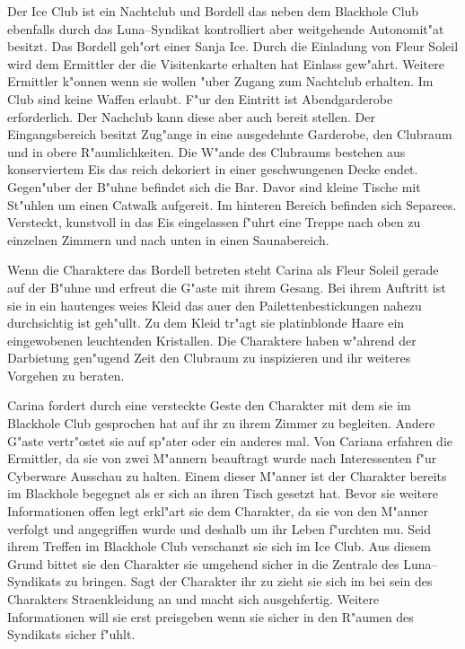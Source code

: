 Der Ice Club ist ein Nachtclub und Bordell das neben dem Blackhole Club ebenfalls durch das Luna--Syndikat kontrolliert aber weitgehende Autonomit"at besitzt. Das Bordell geh"ort einer Sanja Ice. Durch die Einladung von Fleur Soleil wird dem Ermittler der die Visitenkarte erhalten hat Einlass gew"ahrt. Weitere Ermittler k"onnen wenn sie wollen "uber \xl{} Zugang zum Nachtclub erhalten. Im Club sind keine Waffen erlaubt. F"ur den Eintritt ist Abendgarderobe erforderlich. Der Nachclub kann diese aber auch bereit stellen. Der Eingangsbereich besitzt Zug"ange in eine ausgedehnte Garderobe, den Clubraum und in obere R"aumlichkeiten. Die W"ande des Clubraums bestehen aus konserviertem Eis das reich dekoriert in einer geschwungenen Decke endet. Gegen"uber der B"uhne befindet sich die Bar. Davor sind kleine Tische mit St"uhlen um einen Catwalk aufgereit. Im hinteren Bereich befinden sich Separees. Versteckt, kunstvoll in das Eis eingelassen f"uhrt eine Treppe nach oben zu einzelnen Zimmern und nach unten in einen Saunabereich.

Wenn die Charaktere das Bordell betreten steht Carina als Fleur Soleil gerade auf der B"uhne und erfreut die G"aste mit ihrem Gesang. Bei ihrem Auftritt ist sie in ein hautenges wei\3es Kleid das au\3er den Pailettenbestickungen nahezu durchsichtig ist geh"ullt. Zu dem Kleid tr"agt sie platinblonde Haare ein eingewobenen leuchtenden Kristallen. Die Charaktere haben w"ahrend der Darbietung gen"ugend Zeit den Clubraum zu inspizieren und ihr weiteres Vorgehen zu beraten.

Carina fordert durch eine versteckte Geste den Charakter mit dem sie im Blackhole Club gesprochen hat auf ihr zu ihrem Zimmer zu begleiten. Andere G"aste vertr"ostet sie auf sp"ater oder ein anderes mal. Von Cariana erfahren die Ermittler, da\3 sie von zwei M"annern beauftragt wurde nach Interessenten f"ur Cyberware Ausschau zu halten. Einem dieser M"anner ist der Charakter bereits im Blackhole begegnet als er sich an ihren Tisch gesetzt hat. Bevor sie weitere Informationen offen legt erkl"art sie dem Charakter, da\3 sie von den M"anner verfolgt und angegriffen wurde und deshalb um ihr Leben f"urchten mu\3. Seid ihrem Treffen im Blackhole Club verschanzt sie sich im Ice Club. Aus diesem Grund bittet sie den Charakter sie umgehend sicher in die Zentrale des Luna--Syndikats zu bringen. Sagt der Charakter ihr zu zieht sie sich im bei sein des Charakters Stra\3enkleidung an und macht sich ausgehfertig. Weitere Informationen will sie erst preisgeben wenn sie sicher in den R"aumen des Syndikats sicher f"uhlt.

